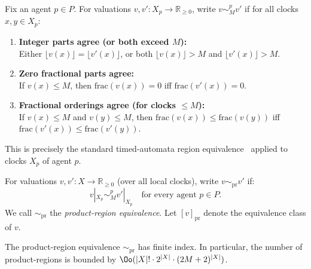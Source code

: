 \begin{definition}
\label{def:per-agent-region}
Fix an agent $p \in P$. For valuations $v, v' : X_p \to \mathbb{R}_{\geq 0}$, write $v \sim^p_M v'$ if for all clocks $x, y \in X_p$:
\begin{enumerate}
\item \textbf{Integer parts agree (or both exceed $M$):} \\
Either $\lfloor v(x) \rfloor = \lfloor v'(x) \rfloor$, or both $\lfloor v(x) \rfloor > M$ and $\lfloor v'(x) \rfloor > M$.

\item \textbf{Zero fractional parts agree:} \\
If $v(x) \leq M$, then $\text{frac}(v(x)) = 0$ iff $\text{frac}(v'(x)) = 0$.

\item \textbf{Fractional orderings agree (for clocks $\leq M$):} \\
If $v(x) \leq M$ and $v(y) \leq M$, then $\text{frac}(v(x)) \leq \text{frac}(v(y))$ iff $\text{frac}(v'(x)) \leq \text{frac}(v'(y))$.
\end{enumerate}
\end{definition}

This is precisely the standard timed-automata region equivalence~\cite{DBLP:journals/tcs/AlurD94} applied to clocks $X_p$ of agent $p$.

\begin{definition}
\label{def:product-region}
For valuations $v, v' : X \to \mathbb{R}_{\geq 0}$ (over all local clocks), write $v \sim_{\text{pr}} v'$ if:
\[
v|_{X_p} \sim^p_M v'|_{X_p} \quad \text{for every agent } p \in P.
\]
We call $\sim_{\text{pr}}$ the \emph{product-region equivalence}. Let $[v]_{\text{pr}}$ denote the equivalence class of $v$.
\end{definition}

\begin{lemma}
\label{lem:size-of-product-regions}
The product-region equivalence $\sim_{\mathrm{pr}}$ has finite index. In
particular, the number of product-regions is bounded by
$\Oo(|X|!\cdot 2^{|X|}\cdot (2M+2)^{|X|})$.
\end{lemma}

